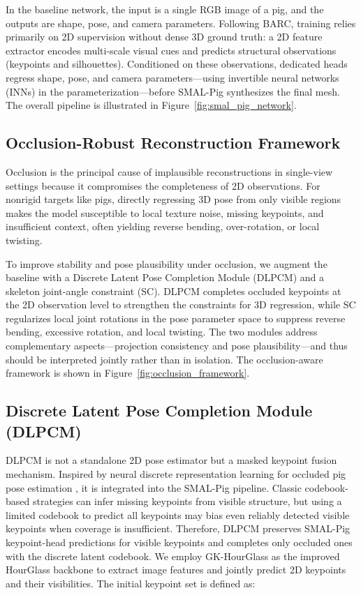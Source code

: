 \documentclass[computers,article,submit,pdftex,moreauthors]{mdpi}
\begin{document}
In the baseline network, the input is a single RGB image of a pig, and the outputs are shape, pose, and camera parameters. Following BARC, training relies primarily on 2D supervision without dense 3D ground truth: a 2D feature extractor encodes multi-scale visual cues and predicts structural observations (keypoints and silhouettes). Conditioned on these observations, dedicated heads regress shape, pose, and camera parameters---using invertible neural networks (INNs) in the parameterization---before SMAL-Pig synthesizes the final mesh. The overall pipeline is illustrated in Figure~\ref{fig:smal_pig_network}.

\subsection{Occlusion-Robust Reconstruction Framework}\label{sec:occlusion_framework}

Occlusion is the principal cause of implausible reconstructions in single-view settings because it compromises the completeness of 2D observations. For nonrigid targets like pigs, directly regressing 3D pose from only visible regions makes the model susceptible to local texture noise, missing keypoints, and insufficient context, often yielding reverse bending, over-rotation, or local twisting.

To improve stability and pose plausibility under occlusion, we augment the baseline with a Discrete Latent Pose Completion Module (DLPCM) and a skeleton joint-angle constraint (SC). DLPCM completes occluded keypoints at the 2D observation level to strengthen the constraints for 3D regression, while SC regularizes local joint rotations in the pose parameter space to suppress reverse bending, excessive rotation, and local twisting. The two modules address complementary aspects---projection consistency and pose plausibility---and thus should be interpreted jointly rather than in isolation. The occlusion-aware framework is shown in Figure~\ref{fig:occlusion_framework}.

\subsection{Discrete Latent Pose Completion Module (DLPCM)}\label{sec:dlpcm}

DLPCM is not a standalone 2D pose estimator but a masked keypoint fusion mechanism. Inspired by neural discrete representation learning for occluded pig pose estimation \cite{ref28}, it is integrated into the SMAL-Pig pipeline. Classic codebook-based strategies can infer missing keypoints from visible structure, but using a limited codebook to predict all keypoints may bias even reliably detected visible keypoints when coverage is insufficient. Therefore, DLPCM preserves SMAL-Pig keypoint-head predictions for visible keypoints and completes only occluded ones with the discrete latent codebook. We employ GK-HourGlass as the improved HourGlass backbone to extract image features and jointly predict 2D keypoints and their visibilities. The initial keypoint set is defined as:
\end{document}
